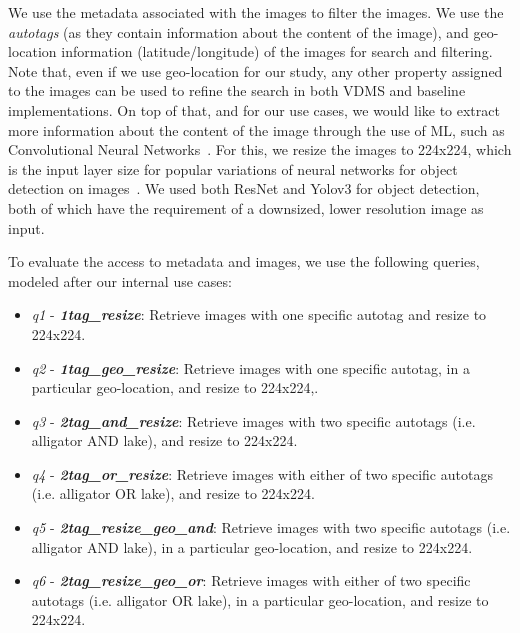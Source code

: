 We use the metadata associated with the images to filter the images.
We use the \textit{autotags} (as they contain information about the content
of the image), and geo-location information (latitude/longitude)
of the images for search and filtering.
Note that, even if we use geo-location for our study, any other property
assigned to the images can be used to refine the search
in both VDMS and baseline implementations.
On top of that, and for our use cases, we would like to extract more information
about the content of the image through the use of ML,
such as Convolutional Neural Networks~\cite{cnn}.
For this, we resize the images to 224x224, which is the input layer size for
popular variations of neural networks for object detection on images~\cite{resnet}.
We used both ResNet and Yolov3 for object detection, both of which
have the requirement of a downsized, lower resolution image as input.

To evaluate the access to metadata and images,
we use the following queries, modeled after our internal use cases:

\begin{itemize}
\item \textit{q1} - {\bf {\em 1tag\_resize}}: Retrieve images with one specific autotag and resize to 224x224.

\item \textit{q2} - {\bf {\em 1tag\_geo\_resize}}: Retrieve images with one specific autotag, in a particular geo-location, and resize to 224x224,.

\item \textit{q3} - {\bf {\em 2tag\_and\_resize}}: Retrieve images with two specific autotags (i.e. alligator AND lake), and resize to 224x224.

\item \textit{q4} - {\bf {\em 2tag\_or\_resize}}: Retrieve images with either of two specific autotags (i.e. alligator OR lake), and resize to 224x224.

\item \textit{q5} - {\bf {\em 2tag\_resize\_geo\_and}}: Retrieve images with two specific autotags (i.e. alligator AND lake), in a particular geo-location, and resize to 224x224.

\item \textit{q6} - {\bf {\em 2tag\_resize\_geo\_or}}: Retrieve images with either of two specific autotags (i.e. alligator OR lake), in a particular geo-location, and resize to 224x224.

\end{itemize}

